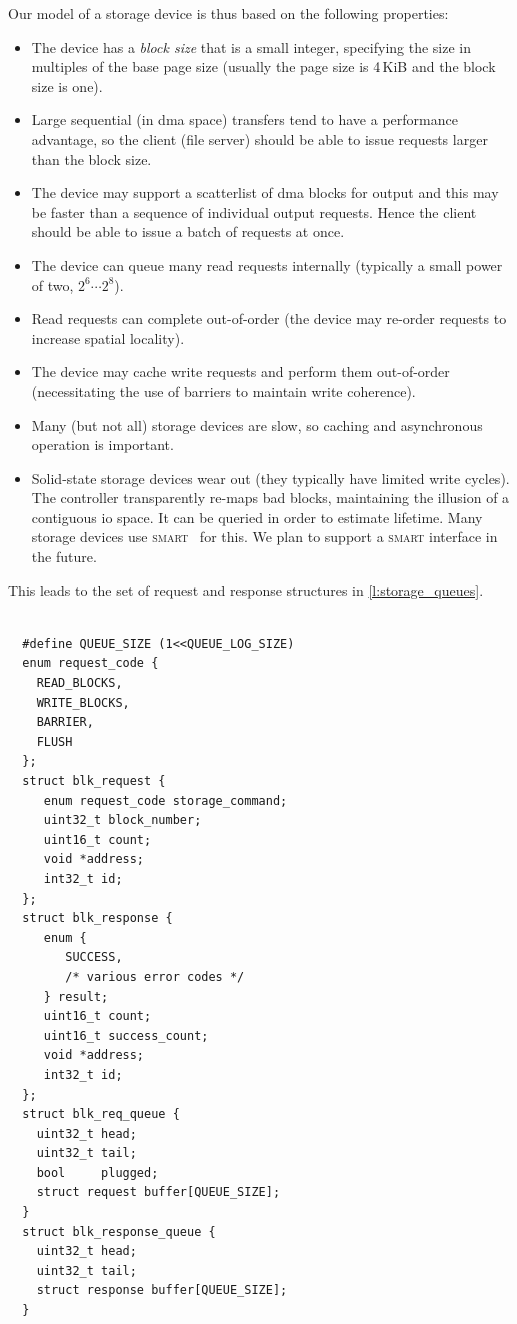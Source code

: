 \documentclass[a4paper,12pt]{report}
\begin{document}
Our model of a storage device is thus based on the following properties:
\begin{itemize}
\item The device has a \emph{block size} that is a small integer,
  specifying the size in multiples of the
  base page size (usually the page size is 4\,KiB and the block size
  is one).
\item Large sequential (in \gls{dma} space) transfers tend to have a
  performance advantage, so the client (file server) should be able to issue
  requests larger than the block size.
\item The device may support a scatterlist of \gls{dma} blocks for output
  and this may be faster than a sequence of individual output
  requests. Hence the client should be able to issue a batch of
  requests at once.
\item The device can queue many read requests internally (typically a small power
  of two, \(2^6\cdots2^8\)).
\item Read requests can complete out-of-order (the device may re-order
  requests to increase spatial locality).
\item The device may cache write requests and perform them out-of-order
  (necessitating the use of barriers to maintain write coherence).
\item Many (but not all) storage devices are slow, so caching and
  asynchronous operation is important.
\item Solid-state storage devices wear out (they typically have
  limited write cycles). The controller transparently re-maps bad
  blocks, maintaining the illusion of a contiguous \gls{io} space. It can
  be queried in order to estimate lifetime.  Many storage devices use
  \textsc{smart}~\citep{smart:url}  for this. We plan to support a
  \textsc{smart} interface in the future.
\end{itemize}


This leads to the set of request and response structures in \autoref{l:storage_queues}.

\begin{lstlisting}[gobble=2,firstline=2,float=th,
  label={l:storage_queues},
  caption={Storage request and response queue data structures.}]

  #define QUEUE_SIZE (1<<QUEUE_LOG_SIZE)
  enum request_code {
    READ_BLOCKS,
    WRITE_BLOCKS,
    BARRIER,
    FLUSH
  };
  struct blk_request {
     enum request_code storage_command;
     uint32_t block_number;
     uint16_t count;
     void *address;
     int32_t id;
  };
  struct blk_response {
     enum {
        SUCCESS,
        /* various error codes */
     } result;
     uint16_t count;
     uint16_t success_count;
     void *address;
     int32_t id;
  };
  struct blk_req_queue {
    uint32_t head;
    uint32_t tail;
    bool     plugged;
    struct request buffer[QUEUE_SIZE];
  }
  struct blk_response_queue {
    uint32_t head;
    uint32_t tail;
    struct response buffer[QUEUE_SIZE];
  }
\end{lstlisting}
\end{document}
